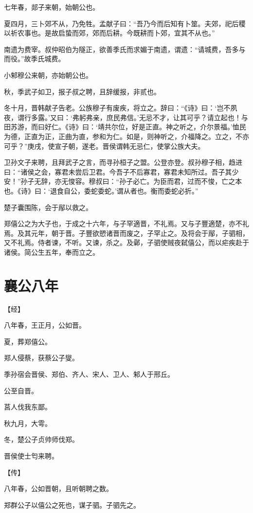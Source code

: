 \documentclass[a4paper,12pt,UTF8,twoside]{ctexbook}
\begin{document}
七年春，郯子来朝，始朝公也。

夏四月，三卜郊不从，乃免牲。孟献子曰：“吾乃今而后知有卜筮。夫郊，祀后稷以祈农事也。是故启蛰而郊，郊而后耕。今既耕而卜郊，宜其不从也。”

南遗为费宰。叔仲昭伯为隧正，欲善季氏而求媚于南遗，谓遗：“请城费，吾多与而役。”故季氏城费。

小邾穆公来朝，亦始朝公也。

秋，季武子如卫，报子叔之聘，且辞缓报，非贰也。

冬十月，晋韩献子告老。公族穆子有废疾，将立之。辞曰：“《诗》曰：‘岂不夙夜，谓行多露。’又曰：‘弗躬弗亲，庶民弗信。’无忌不才，让其可乎？请立起也！与田苏游，而曰好仁。《诗》曰：‘靖共尔位，好是正直。神之听之，介尔景福。’恤民为德，正直为正，正曲为直，参和为仁。如是，则神听之，介福降之。立之，不亦可乎？”庚戌，使宣子朝，遂老。晋侯谓韩无忌仁，使掌公族大夫。

卫孙文子来聘，且拜武子之言，而寻孙桓子之盟。公登亦登。叔孙穆子相，趋进曰：“诸侯之会，寡君未尝后卫君。今吾子不后寡君，寡君未知所过。吾子其少安！”孙子无辞，亦无悛容。穆叔曰：“孙子必亡。为臣而君，过而不悛，亡之本也。《诗》曰：‘退食自公，委蛇委蛇。’谓从者也。衡而委蛇必折。”

楚子囊围陈，会于鄬以救之。

郑僖公之为大子也，于成之十六年，与子罕適晋，不礼焉。又与子豐適楚，亦不礼焉。及其元年，朝于晋。子豐欲愬诸晋而废之，子罕止之。及将会于鄬，子驷相，又不礼焉。侍者谏，不听。又谏，杀之。及鄵，子驷使贼夜弑僖公，而以疟疾赴于诸侯。简公生五年，奉而立之。


\section{襄公八年}



【经】

八年春，王正月，公如晋。

夏，葬郑僖公。

郑人侵蔡，获蔡公子燮。

季孙宿会晋侯、郑伯、齐人、宋人、卫人、邾人于邢丘。

公至自晋。

莒人伐我东鄙。

秋九月，大雩。

冬，楚公子贞帅师伐郑。

晋侯使士匄来聘。

【传】

八年春，公如晋朝，且听朝聘之数。

郑群公子以僖公之死也，谋子驷。子驷先之。
\end{document}
